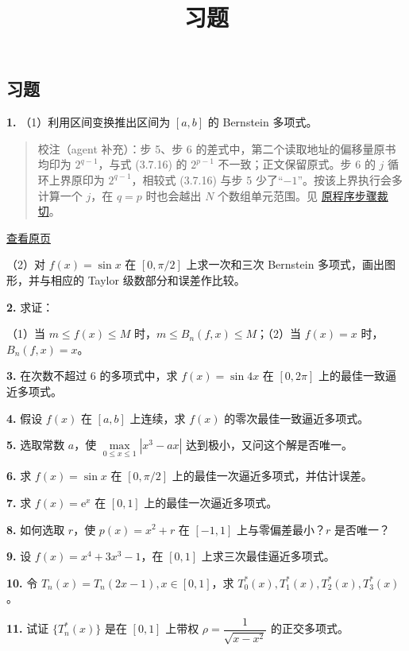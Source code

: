 \documentclass[
  10pt,
  fontset=fandol]{ctexart}
\title{习题}
\author{}
\date{}
\begin{document}
\maketitle

\subsection{习题}\label{ux4e60ux9898}

\textbf{1.} （1）利用区间变换推出区间为 \([a,b]\) 的 Bernstein 多项式。

\begin{quote}
校注（agent 补充）：步 5、步 6 的差式中，第二个读取地址的偏移量原书均印为 \(2^{q-1}\)，与式 (3.7.16) 的 \(2^{p-1}\) 不一致；正文保留原式。步 6 的 \(j\) 循环上界原印为 \(2^{q-1}\)，相较式 (3.7.16) 与步 5 少了``\(-1\)''。按该上界执行会多计算一个 \(j\)，在 \(q=p\) 时也会越出 \(N\) 个数组单元范围。见 \href{../assets/ch03b/p090-fft-steps.png}{原程序步骤裁切}。
\end{quote}

\href{../../source-images/pdf-091.jpeg}{查看原页}

（2）对 \(f(x)=\sin x\) 在 \([0,\pi/2]\) 上求一次和三次 Bernstein 多项式，画出图形，并与相应的 Taylor 级数部分和误差作比较。

\textbf{2.} 求证：

（1）当 \(m\leqslant f(x)\leqslant M\) 时，\(m\leqslant B_n(f,x)\leqslant M\)；（2）当 \(f(x)=x\) 时，\(B_n(f,x)=x\)。

\textbf{3.} 在次数不超过 \(6\) 的多项式中，求 \(f(x)=\sin4x\) 在 \([0,2\pi]\) 上的最佳一致逼近多项式。

\textbf{4.} 假设 \(f(x)\) 在 \([a,b]\) 上连续，求 \(f(x)\) 的零次最佳一致逼近多项式。

\textbf{5.} 选取常数 \(a\)，使 \(\max\limits_{0\leqslant x\leqslant1}|x^3-ax|\) 达到极小，又问这个解是否唯一。

\textbf{6.} 求 \(f(x)=\sin x\) 在 \([0,\pi/2]\) 上的最佳一次逼近多项式，并估计误差。

\textbf{7.} 求 \(f(x)=\mathrm e^x\) 在 \([0,1]\) 上的最佳一次逼近多项式。

\textbf{8.} 如何选取 \(r\)，使 \(p(x)=x^2+r\) 在 \([-1,1]\) 上与零偏差最小？\(r\) 是否唯一？

\textbf{9.} 设 \(f(x)=x^4+3x^3-1\)，在 \([0,1]\) 上求三次最佳逼近多项式。

\textbf{10.} 令 \(T_n(x)=T_n(2x-1),x\in[0,1]\)，求 \(T_0^*(x),T_1^*(x),T_2^*(x),T_3^*(x)\)。

\textbf{11.} 试证 \(\{T_n^*(x)\}\) 是在 \([0,1]\) 上带权 \(\rho=\dfrac1{\sqrt{x-x^2}}\) 的正交多项式。
\end{document}
